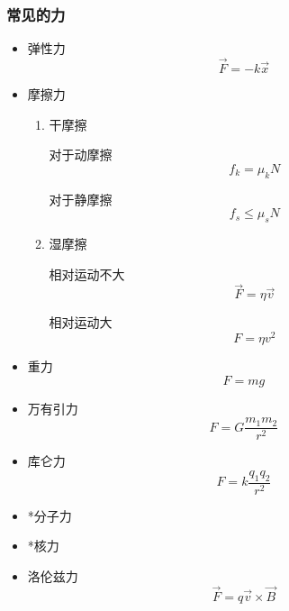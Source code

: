 \documentclass[UTF8]{ctexart}
\begin{document}
		\subsubsection{常见的力}
			\begin{itemize}
				\item 弹性力
					\begin{equation}
						\vec{F} = -k\vec{x}
					\end{equation}
				\item 摩擦力
					\begin{enumerate}
						\item 干摩擦
							\par 对于动摩擦
							\begin{equation}
								f_k = \mu_k N
							\end{equation}
							\par 对于静摩擦
							\begin{equation}
								f_s \leq \mu_s N
							\end{equation}
						\item 湿摩擦
							\par 相对运动不大
							\begin{equation}
								\vec{F} = \eta\vec{v}
							\end{equation}
							\par 相对运动大
							\begin{equation}
								F = \eta v^2
							\end{equation}
					\end{enumerate}
				\item 重力
					\begin{equation}
						F = mg
					\end{equation}
				\item 万有引力
					\begin{equation}
						F = G\frac{m_1m_2}{r^2}
					\end{equation}
				\item 库仑力
					\begin{equation}
						F = k\frac{q_1q_2}{r^2}
					\end{equation}
				\item *分子力
				\item *核力
				\item 洛伦兹力
					\begin{equation}
						\vec{F} = q\vec{v}\times\vec{B}
					\end{equation}
			\end{itemize}
\end{document}
